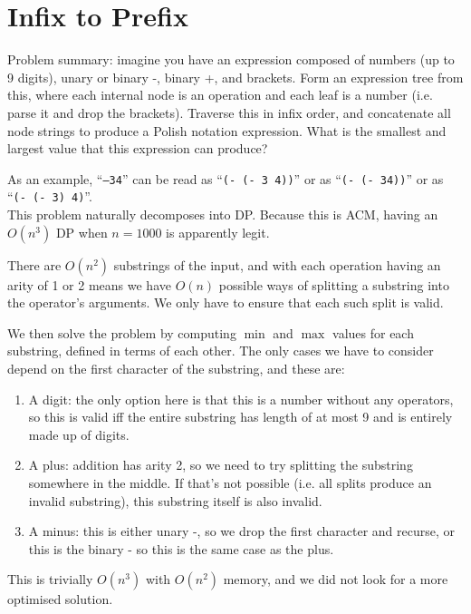 \section{Infix to Prefix}

Problem summary: imagine you have an expression composed of numbers (up to 9
digits), unary or binary -, binary +, and brackets. Form an expression tree from
this, where each internal node is an operation and each leaf is a number (i.e.
parse it and drop the brackets). Traverse this in infix order, and concatenate
all node strings to produce a Polish notation expression. What is the smallest
and largest value that this expression can produce?

As an example, ``\texttt{--34}'' can be read as ``\texttt{(- (- 3 4))}'' or as
``\texttt{(- (- 34))}'' or as ``\texttt{(- (- 3) 4)}''.\\

This problem naturally decomposes into DP. Because this is ACM, having an
$O(n^3)$ DP when $n = 1000$ is apparently legit.

There are $O(n^2)$ substrings of the input, and with each operation having an
arity of 1 or 2 means we have $O(n)$ possible ways of splitting a substring into
the operator's arguments. We only have to ensure that each such split is valid.

We then solve the problem by computing $\min$ and $\max$ values for each
substring, defined in terms of each other. The only cases we have to consider
depend on the first character of the substring, and these are:

\begin{enumerate}

  \item A digit: the only option here is that this is a number without any
  operators, so this is valid iff the entire substring has length of at most 9
  and is entirely made up of digits.

  \item A plus: addition has arity 2, so we need to try splitting the substring
  somewhere in the middle. If that's not possible (i.e. all splits produce an
  invalid substring), this substring itself is also invalid.

  \item A minus: this is either unary -, so we drop the first character and
  recurse, or this is the binary - so this is the same case as the plus.

\end{enumerate}

This is trivially $O(n^3)$ with $O(n^2)$ memory, and we did not look for a more
optimised solution.
